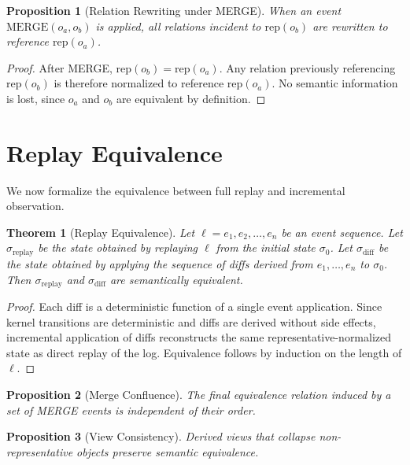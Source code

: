 \documentclass[11pt]{article}
\newtheorem{proposition}{Proposition}[section]
\newtheorem{theorem}{Theorem}[section]
\begin{document}
\begin{proposition}[Relation Rewriting under MERGE]
When an event $\mathrm{MERGE}(o_a,o_b)$ is applied, all relations incident to $\mathrm{rep}(o_b)$ are rewritten to reference $\mathrm{rep}(o_a)$.
\end{proposition}

\begin{proof}
After MERGE, $\mathrm{rep}(o_b)=\mathrm{rep}(o_a)$. Any relation previously referencing $\mathrm{rep}(o_b)$ is therefore normalized to reference $\mathrm{rep}(o_a)$. No semantic information is lost, since $o_a$ and $o_b$ are equivalent by definition.
\end{proof}

\section{Replay Equivalence}

We now formalize the equivalence between full replay and incremental observation.

\begin{theorem}[Replay Equivalence]
Let $\ell = e_1, e_2, \ldots, e_n$ be an event sequence. Let $\sigma_{\mathrm{replay}}$ be the state obtained by replaying $\ell$ from the initial state $\sigma_0$. Let $\sigma_{\mathrm{diff}}$ be the state obtained by applying the sequence of diffs derived from $e_1,\ldots,e_n$ to $\sigma_0$. Then $\sigma_{\mathrm{replay}}$ and $\sigma_{\mathrm{diff}}$ are semantically equivalent.
\end{theorem}

\begin{proof}
Each diff is a deterministic function of a single event application. Since kernel transitions are deterministic and diffs are derived without side effects, incremental application of diffs reconstructs the same representative-normalized state as direct replay of the log. Equivalence follows by induction on the length of $\ell$.
\end{proof}

\begin{proposition}[Merge Confluence]
The final equivalence relation induced by a set of MERGE events is independent of their order.
\end{proposition}

\begin{proposition}[View Consistency]
Derived views that collapse non-representative objects preserve semantic equivalence.
\end{proposition}
\end{document}
